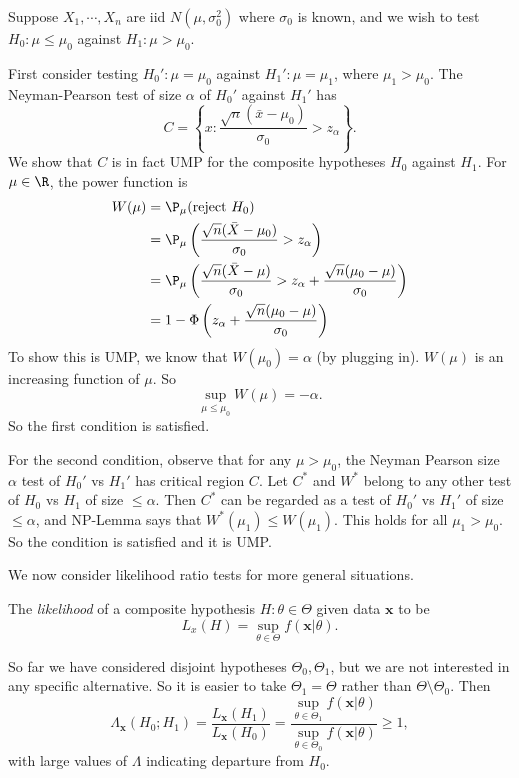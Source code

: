 \documentclass[a4paper]{article}
\begin{document}
\begin{eg}
  Suppose $X_1, \cdots, X_n$ are iid $N(\mu, \sigma_0^2)$ where $\sigma_0$ is known, and we wish to test $H_0: \mu\leq \mu_0$ against $H_1: \mu > \mu_0$.

  First consider testing $H_0': \mu = \mu_0$ against $H_1': \mu = \mu_1$, where $\mu_1 > \mu_0$. The Neyman-Pearson test of size $\alpha$ of $H_0'$ against $H_1'$ has
  \[
    C = \left\{x: \frac{\sqrt{n}(\bar x - \mu_0)}{\sigma_0} >  z_\alpha\right\}.
  \]
  We show that $C$ is in fact UMP for the composite hypotheses $H_0$ against $H_1$. For $\mu\in \R$, the power function is
  \begin{align*}
    W(\mu) &= \P_\mu(\text{reject } H_0)\\
    &= \P_\mu\left(\frac{\sqrt{n}(\bar X - \mu_0)}{\sigma_0} > z_\alpha\right)\\
    &= \P_\mu\left(\frac{\sqrt{n}(\bar X - \mu)}{\sigma_0} > z_\alpha + \frac{\sqrt{n}(\mu_0 - \mu)}{\sigma_0}\right)\\
    &= 1 - \Phi\left(z_\alpha + \frac{\sqrt{n}(\mu_0 - \mu)}{\sigma_0}\right)
  \end{align*}
  To show this is UMP, we know that $W(\mu_0) = \alpha$ (by plugging in). $W(\mu)$ is an increasing function of $\mu$. So
  \[
    \sup_{ \mu \leq \mu_0} W(\mu) =- \alpha.
  \]
  So the first condition is satisfied.

  For the second condition, observe that for any $\mu > \mu_0$, the Neyman Pearson size $\alpha$ test of $H_0'$ vs $H_1'$ has critical region $C$. Let $C^*$ and $W^*$ belong to any other test of $H_0$ vs $H_1$ of size $\leq \alpha$. Then $C^*$ can be regarded as a test of $H_0'$ vs $H_1'$ of size $\leq \alpha$, and NP-Lemma says that $W^*(\mu_1) \leq W(\mu_1)$. This holds for all $\mu_1 > \mu_0$. So the condition is satisfied and it is UMP.
\end{eg}
We now consider likelihood ratio tests for more general situations.
\begin{defi}
  The \emph{likelihood} of a composite hypothesis $H:\theta\in \Theta$ given data $\mathbf{x}$ to be
  \[
    L_x(H) = \sup_{\theta\in \Theta}f(\mathbf{x}|\theta).
  \]
\end{defi}
So far we have considered disjoint hypotheses $\Theta_0, \Theta_1$, but we are not interested in any specific alternative. So it is easier to take $\Theta_1 = \Theta$ rather than $\Theta \setminus\Theta_0$. Then
\[
  \Lambda_\mathbf{x} (H_0; H_1) = \frac{L_\mathbf{x}(H_1)}{L_\mathbf{x}(H_0)}=\frac{\sup_{\theta\in \Theta_1}f(\mathbf{x}|\theta)}{\sup_{\theta\in \Theta_0}f(\mathbf{x}|\theta)} \geq 1,
\]
with large values of $\Lambda$ indicating departure from $H_0$.
\end{document}
